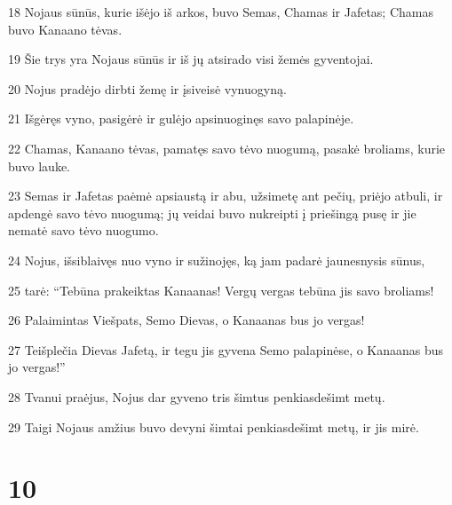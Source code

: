 \par 18 Nojaus sūnūs, kurie išėjo iš arkos, buvo Semas, Chamas ir Jafetas; Chamas buvo Kanaano tėvas. 
\par 19 Šie trys yra Nojaus sūnūs ir iš jų atsirado visi žemės gyventojai. 
\par 20 Nojus pradėjo dirbti žemę ir įsiveisė vynuogyną. 
\par 21 Išgėręs vyno, pasigėrė ir gulėjo apsinuoginęs savo palapinėje. 
\par 22 Chamas, Kanaano tėvas, pamatęs savo tėvo nuogumą, pasakė broliams, kurie buvo lauke. 
\par 23 Semas ir Jafetas paėmė apsiaustą ir abu, užsimetę ant pečių, priėjo atbuli, ir apdengė savo tėvo nuogumą; jų veidai buvo nukreipti į priešingą pusę ir jie nematė savo tėvo nuogumo. 
\par 24 Nojus, išsiblaivęs nuo vyno ir sužinojęs, ką jam padarė jaunesnysis sūnus, 
\par 25 tarė: “Tebūna prakeiktas Kanaanas! Vergų vergas tebūna jis savo broliams! 
\par 26 Palaimintas Viešpats, Semo Dievas, o Kanaanas bus jo vergas! 
\par 27 Teišplečia Dievas Jafetą, ir tegu jis gyvena Semo palapinėse, o Kanaanas bus jo vergas!” 
\par 28 Tvanui praėjus, Nojus dar gyveno tris šimtus penkiasdešimt metų. 
\par 29 Taigi Nojaus amžius buvo devyni šimtai penkiasdešimt metų, ir jis mirė.



\chapter{10}


